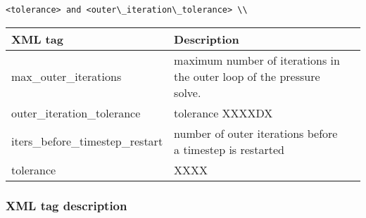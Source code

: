 \begin{Verbatim}[fontsize=\footnotesize]
<tolerance> and <outer\_iteration\_tolerance> \\
\end{Verbatim}
%
\noindent
\begin{tabular}{l p{7cm} p{14cm}}
\footnotesize{XML tag} &  \footnotesize{Description}\\
\hline
\hline
max\_outer\_iterations           &  maximum number of iterations in the outer loop of the pressure solve.\\
outer\_iteration\_tolerance      &  tolerance XXXXDX\\
iters\_before\_timestep\_restart &  \footnotesize number of outer iterations before a timestep is restarted\\
tolerance                        &   XXXX\\
\hline
\end{tabular}


\normalsize
\subsubsection{XML tag description}




